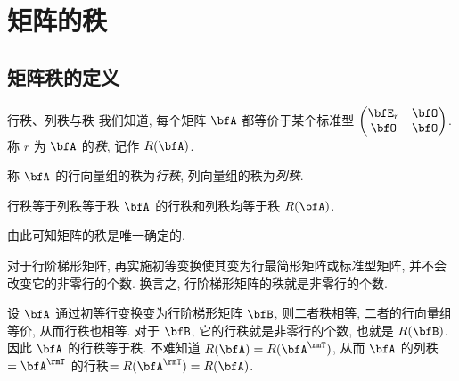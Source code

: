 \section{矩阵的秩}

\subsection{矩阵秩的定义}


\begin{frame}{行秩、列秩与秩}
	\onslide<+->
	我们知道, 每个矩阵 $\bfA$ 都等价于某个标准型
	$\begin{pmatrix}
		\bfE_r&\bfO\\
		\bfO&\bfO
	\end{pmatrix}$.
	\onslide<+->
	称 $r$ 为 $\bfA$ 的\emph{秩}, 记作 \alert{$R(\bfA)$}.

	\onslide<+->
	称 $\bfA$ 的行向量组的秩为\emph{行秩}, 列向量组的秩为\emph{列秩}.
	\onslide<+->
	\begin{second}{行秩等于列秩等于秩}
		$\bfA$ 的行秩和列秩均等于秩 $R(\bfA)$.
	\end{second}
	\onslide<+->
	由此可知矩阵的秩是唯一确定的.

	\onslide<+->
	对于行阶梯形矩阵, 再实施初等变换使其变为行最简形矩阵或标准型矩阵, 并不会改变它的非零行的个数.
	\onslide<+->
	换言之, \alert{行阶梯形矩阵的秩就是非零行的个数}.

	\onslide<+->
	设 $\bfA$ 通过初等行变换变为行阶梯形矩阵 $\bfB$, 则二者秩相等, 二者的行向量组等价, 从而行秩也相等.
	\onslide<+->
	对于 $\bfB$, 它的行秩就是非零行的个数, 也就是 $R(\bfB)$.
	\onslide<+->
	因此 $\bfA$ 的行秩等于秩.
	\onslide<+->
	不难知道 $R(\bfA)=R(\bfA^\rmT)$,
	从而 $\bfA$ 的列秩$=\bfA^\rmT$ 的行秩$=R(\bfA^\rmT)=R(\bfA)$.
\end{frame}


